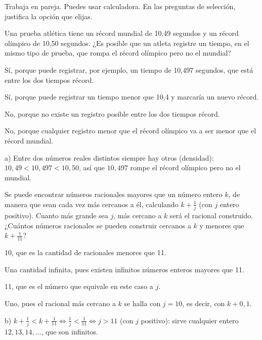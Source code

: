 \documentclass[11pt]{article}
\begin{document}
\encabezado

\begin{instrucciones}
Trabaja en pareja. Puedes usar calculadora. En las preguntas de selección, justifica la
opción que elijas.
\end{instrucciones}

\begin{preguntas}

\pregunta[1] Una prueba atlética tiene un récord mundial de 10,49 segundos y un récord
olímpico de 10,50 segundos. ¿Es posible que un atleta registre un tiempo, en el mismo tipo de
prueba, que rompa el récord olímpico pero no el mundial?
\begin{opciones}
  \item Sí, porque puede registrar, por ejemplo, un tiempo de 10,497 segundos, que está entre
        los dos tiempos récord.
  \item Sí, porque puede registrar un tiempo menor que 10,4 y marcaría un nuevo récord.
  \item No, porque no existe un registro posible entre los dos tiempos récord.
  \item No, porque cualquier registro menor que el récord olímpico va a ser menor que el
        récord mundial.
\end{opciones}
\begin{solucion}
a) Entre dos números reales distintos siempre hay otros (densidad):
$10{,}49 < 10{,}497 < 10{,}50$, así que $10{,}497$ rompe el récord olímpico pero no el mundial.
\end{solucion}

\pregunta[1] Se puede encontrar números racionales mayores que un número entero $k$, de manera
que sean cada vez más cercanos a él, calculando $k + \frac{1}{j}$ (con $j$ entero positivo).
Cuanto más grande sea $j$, más cercano a $k$ será el racional construido. ¿Cuántos números
racionales se pueden construir cercanos a $k$ y menores que $k + \frac{1}{11}$?
\begin{opciones}
  \item 10, que es la cantidad de racionales menores que 11.
  \item Una cantidad infinita, pues existen infinitos números enteros mayores que 11.
  \item 11, que es el número que equivale en este caso a $j$.
  \item Uno, pues el racional más cercano a $k$ se halla con $j = 10$, es decir, con
        $k + 0{,}1$.
\end{opciones}
\begin{solucion}
b) $k + \frac{1}{j} < k + \frac{1}{11} \iff \frac{1}{j} < \frac{1}{11} \iff j > 11$ (con $j$
positivo): sirve cualquier entero $12, 13, 14, \ldots$, que son infinitos.
\end{solucion}


\end{preguntas}
\end{document}
